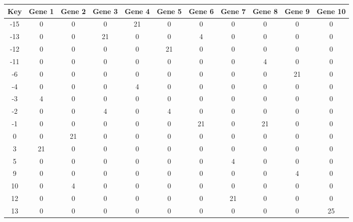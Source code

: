 \begin{tabular}{|c|c|c|c|c|c|c|c|c|c|c|}
\hline
Key & Gene 1 & Gene 2 & Gene 3 & Gene 4 & Gene 5 & Gene 6 & Gene 7 & Gene 8 & Gene 9 & Gene 10 \\
\hline
-15 & 0 & 0 & 0 & 21 & 0 & 0 & 0 & 0 & 0 & 0 \\
-13 & 0 & 0 & 21 & 0 & 0 & 4 & 0 & 0 & 0 & 0 \\
-12 & 0 & 0 & 0 & 0 & 21 & 0 & 0 & 0 & 0 & 0 \\
-11 & 0 & 0 & 0 & 0 & 0 & 0 & 0 & 4 & 0 & 0 \\
-6 & 0 & 0 & 0 & 0 & 0 & 0 & 0 & 0 & 21 & 0 \\
-4 & 0 & 0 & 0 & 4 & 0 & 0 & 0 & 0 & 0 & 0 \\
-3 & 4 & 0 & 0 & 0 & 0 & 0 & 0 & 0 & 0 & 0 \\
-2 & 0 & 0 & 4 & 0 & 4 & 0 & 0 & 0 & 0 & 0 \\
-1 & 0 & 0 & 0 & 0 & 0 & 21 & 0 & 21 & 0 & 0 \\
0 & 0 & 21 & 0 & 0 & 0 & 0 & 0 & 0 & 0 & 0 \\
3 & 21 & 0 & 0 & 0 & 0 & 0 & 0 & 0 & 0 & 0 \\
5 & 0 & 0 & 0 & 0 & 0 & 0 & 4 & 0 & 0 & 0 \\
9 & 0 & 0 & 0 & 0 & 0 & 0 & 0 & 0 & 4 & 0 \\
10 & 0 & 4 & 0 & 0 & 0 & 0 & 0 & 0 & 0 & 0 \\
12 & 0 & 0 & 0 & 0 & 0 & 0 & 21 & 0 & 0 & 0 \\
13 & 0 & 0 & 0 & 0 & 0 & 0 & 0 & 0 & 0 & 25 \\
\hline
\end{tabular}